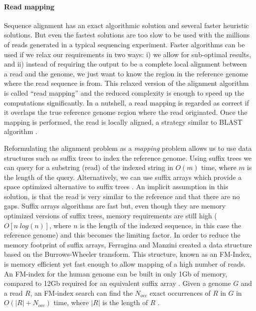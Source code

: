 \paragraph{Read mapping} 
Sequence alignment has an exact algorithmic solution and several faster heuristic solutions. 
But even the fastest solutions are too slow to be used with the millions of reads generated in a typical sequencing experiment. Faster algorithms can be used if we relax our requirements in two ways: 
i) we allow for sub-optimal results, and 
ii) instead of requiring the output to be a complete local alignment between a read and the genome, we just want to know the region in the reference genome where the read sequence is from. 
This relaxed version of the alignment algorithm is called ``read mapping'' and the reduced complexity is enough to speed up the computations significantly. 
In a nutshell, a read mapping is regarded as correct if it overlaps the true reference genome region where the read originated. 
Once the mapping is performed, the read is locally aligned, a strategy similar to BLAST algorithm \cite{li2010fast, langmead2009ultrafast}.

Reformulating the alignment problem as a \textit{mapping} problem allows us to use data structures such as suffix trees to index the reference genome. 
Using suffix trees we can query for a substring (read) \cite{durbin1998biological} of the indexed string in $O(m)$ time, where $m$ is the length of the query. 
Alternatively, we can use suffix arrays which provide a space optimized alternative to suffix trees \cite{durbin1998biological}. 
An implicit assumption in this solution, is that the read is very similar to the reference and that there are no gaps. 
Suffix arrays algorithms are fast but, even though they are memory optimized versions of suffix trees, memory requirements are still high ($O[ n \; log(n) ]$, where $n$ is the length of the indexed sequence, in this case the reference genome) and this becomes the limiting factor. 
In order to reduce the memory footprint of suffix arrays, Ferragina and Manzini \cite{ferragina2000opportunistic} created a data structure based on the Burrows-Wheeler transform. 
This structure, known as an FM-Index, is memory efficient yet fast enough to allow mapping of a high number of reads. 
An FM-index for the human genome can be built in only 1Gb of memory, compared to 12Gb required for an equivalent suffix array \cite{li2010fast}.  Given a genome $G$ and a read $R$, an FM-index search can find the $N_{occ}$ exact occurrences of $R$ in $G$ in $O(|R| + N_{occ} )$ time, where $|R|$ is the length of $R$ \cite{li2010fast}. 

